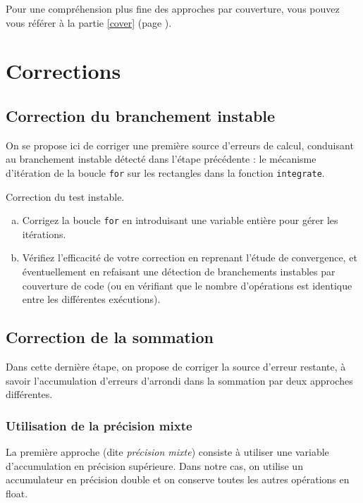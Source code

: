 \documentclass[a4paper]{article}
\newcounter{Question}
\newenvironment{question}[1][\unskip]{
  \bigskip
  \stepcounter{Question}
  \def\questionTitle{ #1}
  \begin{mdframed}[style=question]
  }{
  \end{mdframed}
}
\newenvironment{warn}[1][Attention :]{
  \begin{mdframed}[style=warning]
    \noindent{\bf #1}
}{
  \end{mdframed}
}
\begin{document}
\begin{warn}
Pour une compréhension plus fine des approches par couverture, vous
pouvez vous référer à la partie \ref{cover} (page \pageref{cover}).  
\end{warn}



\section{Corrections}
\subsection{Correction du branchement instable}
\label{sec:fix.if}

On se propose ici de corriger une première source d'erreurs de calcul,
conduisant au branchement instable détecté dans l'étape précédente : le
mécanisme d'itération de la boucle \texttt{for} sur les rectangles dans la
fonction \texttt{integrate}.

\begin{question}
  Correction du test instable.
  \begin{enumerate}[(a)]
  \item Corrigez la boucle \texttt{for} en introduisant une variable entière
    pour gérer les itérations.
  \item Vérifiez l'efficacité de votre correction en reprenant l'étude de
    convergence, et éventuellement en refaisant une détection de branchements
    instables par couverture de code (ou en vérifiant que le nombre d'opérations
    est identique entre les différentes exécutions).
  \end{enumerate}
\end{question}


\subsection{Correction de la sommation}
Dans cette dernière étape, on propose de corriger la source d'erreur restante, à savoir
l'accumulation d'erreurs d'arrondi dans la sommation par deux approches différentes.

\subsubsection{Utilisation de la précision mixte}
La première approche (dite \textit{précision mixte}) consiste à
utiliser une variable d'accumulation
en précision supérieure. Dans notre cas, on utilise un accumulateur en
précision double et on conserve toutes les autres opérations en float.
\end{document}
